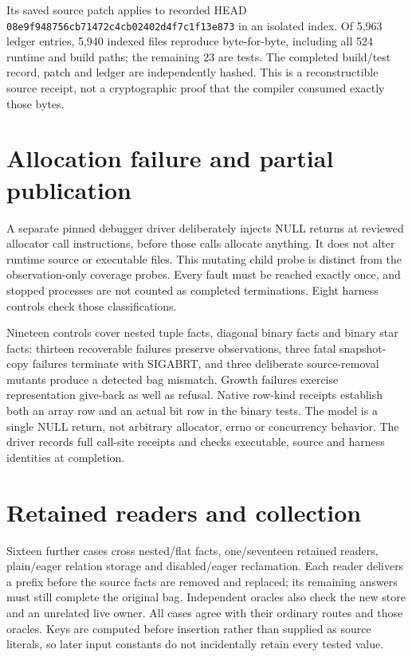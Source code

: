 \documentclass[11pt,a4paper]{article}
\newcommand{\code}[1]{\nolinkurl{#1}}
\begin{document}
Its saved source patch applies to recorded HEAD
\code{08e9f948756cb71472c4cb02402d4f7c1f13e873} in an isolated index.
Of 5,963 ledger entries, 5,940 indexed files reproduce byte-for-byte,
including all 524 runtime and build paths; the remaining 23 are tests.
The completed build/test record, patch and ledger are independently hashed.
This is a reconstructible source receipt, not a cryptographic proof that the
compiler consumed exactly those bytes.

\section{Allocation failure and partial publication}

A separate pinned debugger driver deliberately injects NULL returns at
reviewed allocator call instructions, before those calls allocate anything.
It does not alter runtime source or executable files. This mutating child
probe is distinct from the observation-only coverage probes. Every fault
must be reached exactly once, and stopped processes are not counted as
completed terminations. Eight harness controls check those classifications.

Nineteen controls cover nested tuple facts, diagonal binary facts and binary
star facts: thirteen recoverable failures preserve observations, three fatal
snapshot-copy failures terminate with SIGABRT, and three deliberate
source-removal mutants produce a detected bag mismatch. Growth failures
exercise representation give-back as well as refusal. Native row-kind
receipts establish both an array row and an actual bit row in the binary
tests. The model is a single NULL return, not arbitrary allocator, errno or
concurrency behavior. The driver records full call-site receipts and checks
executable, source and harness identities at completion.

\section{Retained readers and collection}

Sixteen further cases cross nested/flat facts, one/seventeen retained readers,
plain/eager relation storage and disabled/eager reclamation. Each reader
delivers a prefix before the source facts are removed and replaced; its
remaining answers must still complete the original bag. Independent oracles
also check the new store and an unrelated live owner. All cases agree with
their ordinary routes and those oracles.
Keys are computed before insertion rather than supplied as source literals,
so later input constants do not incidentally retain every tested value.
\end{document}

